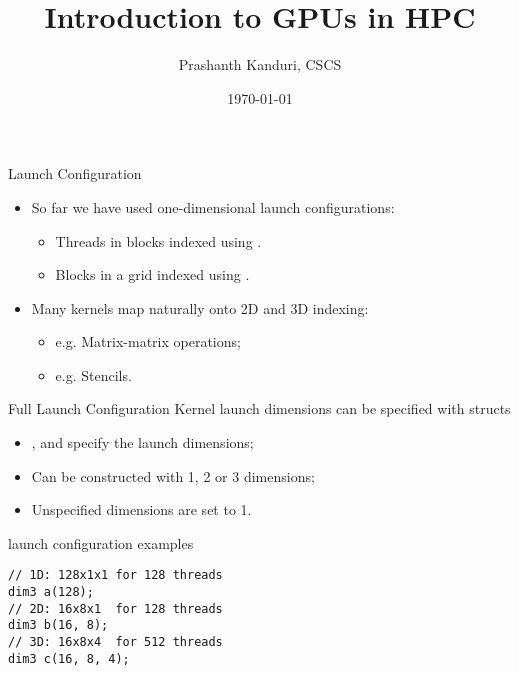\documentclass[aspectratio=43]{beamer}
\author{Prashanth Kanduri, CSCS}
\title{Introduction to GPUs in HPC}
\subtitle{}
\date{\today}
\begin{document}
\cscstitle


\begin{frame}[fragile]{Launch Configuration}
       \begin{itemize}
           \item So far we have used one-dimensional launch configurations:
           \begin{itemize}
               \item Threads in blocks indexed using .
               \item Blocks in a grid indexed using .
           \end{itemize}
           \item Many kernels map naturally onto 2D and 3D indexing:
           \begin{itemize}
               \item e.g. Matrix-matrix operations;
               \item e.g. Stencils.
           \end{itemize}
       \end{itemize}

\end{frame}

\begin{frame}[fragile]{Full Launch Configuration}
        Kernel launch dimensions can be specified with  structs
        \begin{center}
        \end{center}
       \begin{itemize}
           \item {},  and  specify the launch dimensions;
           \item Can be constructed with 1, 2 or 3 dimensions;
           \item Unspecified  dimensions are set to 1.
       \end{itemize}

   \begin{code}{launch configuration examples}
        \begin{lstlisting}[style=boxcudatiny]
// 1D: 128x1x1 for 128 threads
dim3 a(128);
// 2D: 16x8x1  for 128 threads
dim3 b(16, 8);
// 3D: 16x8x4  for 512 threads
dim3 c(16, 8, 4);
        \end{lstlisting}
   \end{code}

\end{frame}
\end{document}
